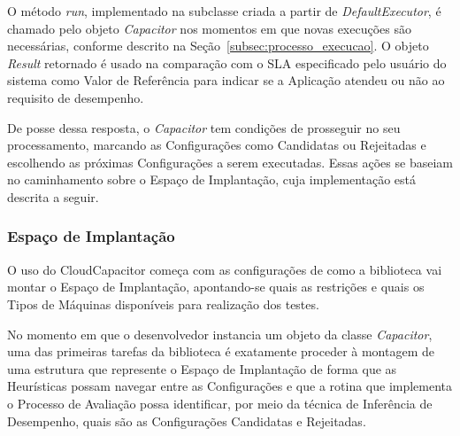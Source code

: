 O método \emph{run}, implementado na subclasse criada a partir de 
\emph{DefaultExecutor}, é chamado pelo objeto \emph{Capacitor} nos momentos em
que novas execuções são necessárias, conforme descrito na 
Seção~\ref{subsec:processo_execucao}. O objeto \emph{Result} retornado é usado
na comparação com o SLA especificado pelo usuário do sistema como Valor de
Referência para indicar se a Aplicação atendeu ou não ao requisito de desempenho.

De posse dessa resposta, o \emph{Capacitor} tem condições de prosseguir no seu
processamento, marcando as Configurações como Candidatas ou Rejeitadas e 
escolhendo as próximas Configurações a serem executadas. Essas ações se baseiam
no caminhamento sobre o Espaço de Implantação, cuja implementação está descrita
a seguir.

\subsubsection{Espaço de Implantação}
\label{subsubsec:funcionamento_depspace}
O uso do CloudCapacitor começa com as configurações de como a 
biblioteca vai montar o Espaço de Implantação, apontando-se quais as restrições 
e quais os Tipos de Máquinas disponíveis para realização dos testes.

No momento em que o desenvolvedor instancia um objeto da classe \emph{Capacitor},
uma das primeiras tarefas da biblioteca é exatamente proceder à montagem de uma
estrutura que represente o Espaço de Implantação de forma que as Heurísticas
possam navegar entre as Configurações e que a rotina que implementa o Processo de
Avaliação possa identificar, por meio da técnica de Inferência de Desempenho, 
quais são as Configurações Candidatas e Rejeitadas. 

